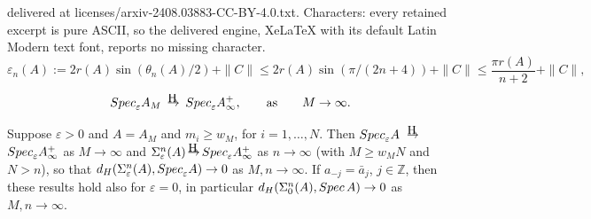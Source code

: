 \documentclass[10pt,a4paper]{amsart}
\newcommand\Hto{
   \unitlength0.1ex
   \begin{picture}(30,15)
   \put(13,16){\makebox(0,0)[]{\tiny\rm H}}
   \put(15,5){\makebox(0,0)[]{$\to$}}
   \end{picture}
}
\newcommand\Spec{{\rm Spec}\,}  %
\newcommand\Speps{{\rm Spec}_\eps}
\newcommand\Z{{\mathbb Z}}
\newcommand\eps{{\varepsilon}}
\begin{document}
delivered at licenses/arxiv-2408.03883-CC-BY-4.0.txt. Characters: every retained excerpt is pure ASCII, so the delivered engine, XeLaTeX with its default Latin Modern text font, reports no missing character.
\begin{equation} \label{eq:epsdef}
\eps_n(A) := 2r(A) \sin(\theta_n(A)/2) + \|C\| \leq 2r(A) \sin(\pi/(2n+4)) + \|C\|\leq \frac{\pi r(A)}{n+2} + \|C\|,
\end{equation}

\begin{equation} \label{eq:Toep}
\Speps A_M\ \Hto\ \Speps A_\infty^{+}, \qquad \mbox{as} \qquad M\to\infty.
\end{equation}

\begin{theorem} \label{thm:Tgen}
Suppose $\eps>0$ and $A=A_M$ and $m_i\geq w_M$, for $i=1,\ldots,N$. Then $\Speps A$ $\Hto$ $\Speps A_\infty^{+}$ as $M\to\infty$ and $\Sigma_\eps^n(A)\Hto  \Speps A_\infty^{+}$ as $n\to\infty$ (with $M\geq w_M N$ and $N>n$), so that $d_H(\Sigma_\eps^n(A),\Speps A)\to 0$ as  $M,n\to\infty$. If $a_{-j} = \bar a_j$, $j\in \Z$, then these results hold also for $\eps=0$, in particular $d_H(\Sigma_0^n(A),\Spec A)\to 0$ as  $M,n\to\infty$.
\end{theorem}
\end{document}
